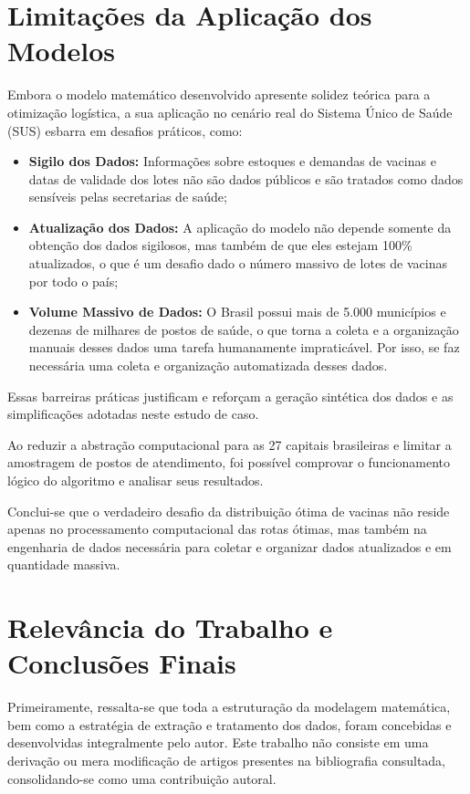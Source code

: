 \section{Limitações da Aplicação dos Modelos}

Embora o modelo matemático desenvolvido apresente solidez teórica para a otimização logística, a sua aplicação no cenário real do Sistema Único de Saúde (SUS) esbarra em desafios práticos, como:

\begin{itemize}
    \item \textbf{Sigilo dos Dados:} Informações sobre estoques e demandas de vacinas e datas de validade dos lotes não são dados públicos e são tratados como dados sensíveis pelas secretarias de saúde;
    \item \textbf{Atualização dos Dados:} A aplicação do modelo não depende somente da obtenção dos dados sigilosos, mas também de que eles estejam 100\% atualizados, o que é um desafio dado o número massivo de lotes de vacinas por todo o país;
    \item \textbf{Volume Massivo de Dados:} O Brasil possui mais de 5.000 municípios e dezenas de milhares de postos de saúde, o que torna a coleta e a organização manuais desses dados uma tarefa humanamente impraticável. Por isso, se faz necessária uma coleta e organização automatizada desses dados.
\end{itemize}

Essas barreiras práticas justificam e reforçam a geração sintética dos dados e as simplificações adotadas neste estudo de caso. 

Ao reduzir a abstração computacional para as 27 capitais brasileiras e limitar a amostragem de postos de atendimento, foi possível comprovar o funcionamento lógico do algoritmo e analisar seus resultados. 

Conclui-se que o verdadeiro desafio da distribuição ótima de vacinas não reside apenas no processamento computacional das rotas ótimas, mas também na engenharia de dados necessária para coletar e organizar dados atualizados e em quantidade massiva.

\section{Relevância do Trabalho e Conclusões Finais}

Primeiramente, ressalta-se que toda a estruturação da modelagem matemática, bem como a estratégia de extração e tratamento dos dados, foram concebidas e desenvolvidas integralmente pelo autor. Este trabalho não consiste em uma derivação ou mera modificação de artigos presentes na bibliografia consultada, consolidando-se como uma contribuição autoral.

